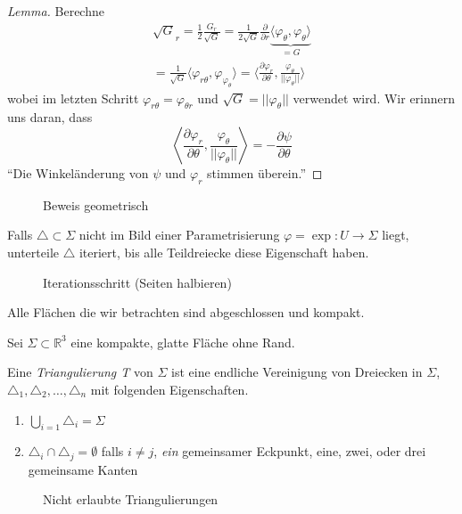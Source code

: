 \documentclass[../main.tex]{subfiles}
\begin{document}
\begin{proof}[Lemma]
    Berechne 
    \begin{align*}
        \sqrt{G}_r = \frac{1}{2} \frac{G_r}{\sqrt{G}} = \frac{1}{2\sqrt{G}} \frac{\partial}{\partial r} \underbrace{\langle \varphi_{\theta} , \varphi_{\theta} \rangle}_{=G} \\
        = \frac{1}{\sqrt{G}} \langle \varphi_{r\theta}, \varphi_{\varphi_\theta} \rangle = \langle \frac{\partial \varphi _r}{\partial \theta} , \frac{\varphi_{\theta}}{||\varphi _{\theta}||} \rangle
    \end{align*} wobei im letzten Schritt $\varphi_{r\theta} = \varphi_{\theta r}$ und $\sqrt{G} = ||\varphi_{\theta}||$ verwendet wird.
    Wir erinnern uns daran, dass
    $$\left \langle \frac{\partial \varphi_r}{\partial \theta}, \frac{\varphi _{\theta}}{||\varphi_{\theta}||} \right \rangle = -\frac{\partial \psi}{\partial \theta}$$
    ``Die Winkeländerung von $\psi$ und $\varphi_r$ stimmen überein.''
\end{proof}

\begin{figure}[htb]
    \centering
    \def\svgwidth{30em}
    
    \caption{Beweis geometrisch}        
\end{figure}

\begin{remark}
    Falls $\triangle \subset \Sigma$ nicht im Bild einer Parametrisierung
    $\varphi = \exp : U \to \Sigma $ liegt, unterteile $\triangle$ iteriert, bis alle Teildreiecke diese Eigenschaft haben.
\end{remark}

\begin{figure}[htb]
    \centering
    \def\svgwidth{10em}
    
    \caption{Iterationsschritt (Seiten halbieren)}        
\end{figure}

Alle Flächen die wir betrachten sind abgeschlossen und kompakt.

Sei $\Sigma \subset \mathbb{R}^3$ eine kompakte, glatte Fläche ohne Rand.
\begin{definition}
    Eine \emph{Triangulierung T} von $\Sigma$ ist eine endliche Vereinigung von Dreiecken in $\Sigma$,
    $\triangle_1, \triangle_2, \dots, \triangle_n$ mit folgenden Eigenschaften.
    \begin{enumerate}
        \item $\bigcup_{i=1} \triangle_i = \Sigma$
        \item $\triangle_i \cap \triangle_j = \emptyset$ falls $i \not = j$, \emph{ein} gemeinsamer Eckpunkt, eine, zwei, oder drei gemeinsame Kanten
    \end{enumerate}

    \begin{figure}[htb]
        \centering
        \def\svgwidth{30em}
        
        \caption{Nicht erlaubte Triangulierungen}        
    \end{figure}

\end{definition}
\end{document}
